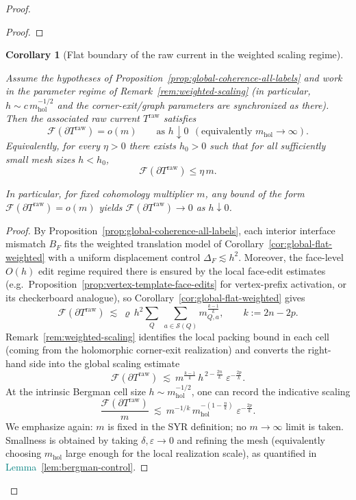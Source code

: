 \documentclass[11pt]{article}
\newcommand{\REVMZ}[1]{\textcolor{teal}{#1}}  %
\numberwithin{equation}{section}  %
\theoremstyle{plain}
\newtheorem{corollary}[theorem]{Corollary}
\theoremstyle{definition}
\theoremstyle{remark}
\newcommand{\mhol}{m_{\mathrm{hol}}} %
\begin{document}
\begin{proof}
\begin{proof}
\end{proof}



\begin{corollary}[Flat boundary of the raw current in the weighted scaling regime]\label{cor:raw-boundary-flat-small}\label{prop:global-flat-control}

Assume the hypotheses of Proposition~\ref{prop:global-coherence-all-labels} and work in the parameter regime of
Remark~\ref{rem:weighted-scaling} (in particular, $h\sim c\,\mhol^{-1/2}$ and the corner-exit/graph parameters are synchronized as there).
Then the associated raw current $T^{\mathrm{raw}}$ satisfies
\[
\mathcal F(\partial T^{\mathrm{raw}})=o(m)\qquad\text{as }h\downarrow 0\ \ (\text{equivalently }\mhol\to\infty).
\]
Equivalently, for every $\eta>0$ there exists $h_0>0$ such that for all sufficiently small mesh sizes $h<h_0$,
\[
\mathcal F(\partial T^{\mathrm{raw}})\le \eta\,m.
\]


In particular, for fixed cohomology multiplier $m$, any bound of the form $\mathcal{F}(\partial T^{\mathrm{raw}})=o(m)$ yields $\mathcal{F}(\partial T^{\mathrm{raw}})\to 0$ as $h\downarrow 0$.


\end{corollary}


\begin{proof}

By Proposition~\ref{prop:global-coherence-all-labels}, each interior interface mismatch $B_F$ fits the weighted translation model
of Corollary~\ref{cor:global-flat-weighted} with a uniform displacement control $\Delta_F\lesssim h^2$.
Moreover, the face-level $O(h)$ edit regime required there is ensured by the local face-edit estimates
(e.g.\ Proposition~\ref{prop:vertex-template-face-edits} for vertex-prefix activation, or its checkerboard analogue),
so Corollary~\ref{cor:global-flat-weighted} gives
\[
\mathcal F\!\left(\partial T^{\mathrm{raw}}\right)
\ \lesssim\ \varrho\,h^2\sum_Q\ \sum_{a\in\mathcal S(Q)} m_{Q,a}^{\frac{k-1}{k}},
\qquad k:=2n-2p.
\]
Remark~\ref{rem:weighted-scaling} identifies the local packing bound in each cell (coming from the holomorphic corner-exit realization)
and converts the right-hand side into the global scaling estimate
\[
\mathcal F(\partial T^{\mathrm{raw}})
\ \lesssim\ m^{\frac{k-1}{k}}\,h^{\,2-\frac{2n}{k}}\;\varepsilon^{-\frac{2p}{k}}.
\]
At the intrinsic Bergman cell size $h\sim \mhol^{-1/2}$, one can record the indicative scaling {
\[
\frac{\mathcal F(\partial T^{\mathrm{raw}})}{m}\ \lesssim\ m^{-1/k}\,\mhol^{-\left(1-\frac{n}{k}\right)}\;\varepsilon^{-\frac{2p}{k}}.
\]
}
{We emphasize again: $m$ is fixed in the SYR definition; no $m\to\infty$ limit is taken. Smallness is obtained by taking $\delta,\varepsilon\to0$ and refining the mesh (equivalently choosing $\mhol$ large enough for the local realization scale), as quantified in \REVMZ{Lemma~\ref{lem:bergman-control}}.}


\end{proof}
\end{proof}
\end{document}

